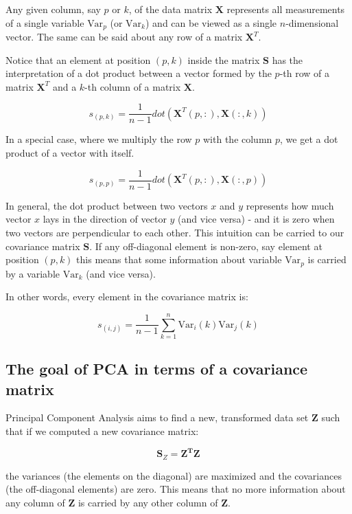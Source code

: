 \documentclass[10pt,twocolumn]{article}
\begin{document}
Any given column, say $p$ or $k$, of the data matrix $\bm{X}$ represents all measurements of a single variable $\text{Var}_p$ (or $\text{Var}_k$) and can be viewed as a single $n$-dimensional vector. The same can be said about any row of a matrix $\bm{X}^T$.

Notice that an element at position $(p,k)$ inside the matrix $\bm{S}$ has the interpretation of a dot product between a vector formed by the $p$-th row of a matrix $\bm{X}^T$ and a $k$-th column of a matrix $\bm{X}$. 

\begin{equation}
s_{(p,k)} = \frac{1}{n-1} dot( \bm{X}^T(p, :), \bm{X}(:,k))
\end{equation}

In a special case, where we multiply the row $p$ with the column $p$, we get a dot product of a vector with itself.

\begin{equation}
s_{(p,p)} = \frac{1}{n-1} dot( \bm{X}^T(p, :), \bm{X}(:,p))
\end{equation}

In general, the dot product between two vectors $x$ and $y$ represents how much vector $x$ lays in the direction of vector $y$ (and vice versa) - and it is zero when two vectors are perpendicular to each other. This intuition can be carried to our covariance matrix $\bm{S}$. If any off-diagonal element is non-zero, say element at position $(p,k)$ this means that some information about variable $\text{Var}_p$ is carried by a variable $\text{Var}_k$ (and vice versa).

In other words, every element in the covariance matrix is:

\begin{equation}
s_{(i,j)} = \frac{1}{n-1} \sum\limits_{k=1}^n \text{Var}_i(k) \text{Var}_j(k)
\end{equation}

\subsection{The goal of PCA in terms of a covariance matrix}

Principal Component Analysis aims to find a new, transformed data set $\bm{Z}$ such that if we computed a new covariance matrix:

\begin{equation}
\bm{S}_Z =  \bm{Z^T} \bm{Z}
\end{equation}

the variances (the elements on the diagonal) are maximized and the covariances (the off-diagonal elements) are zero. This means that no more information about any column of $\bm{Z}$ is carried by any other column of $\bm{Z}$.
\end{document}
